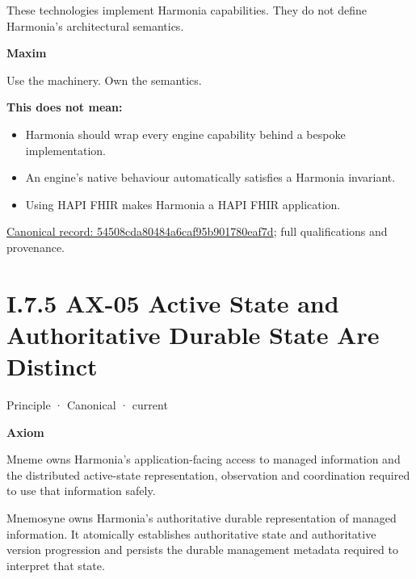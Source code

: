 These technologies implement Harmonia capabilities. They do not define
Harmonia's architectural semantics.



\par\medskip\textbf{Maxim}\par


Use the machinery. Own the semantics.



\textbf{This does not mean:}



\begin{itemize}


\item Harmonia should wrap every engine capability behind a bespoke implementation.

\item An engine's native behaviour automatically satisfies a Harmonia invariant.

\item Using HAPI FHIR makes Harmonia a HAPI FHIR application.

\end{itemize}

{\footnotesize \href{../../../../../../../../continuum/motivation/principle/54508cda80484a6caf95b901780eaf7d.md}{Canonical record: 54508cda80484a6caf95b901780eaf7d}; full qualifications and provenance.}\par
\section*{I.7.5 AX-05 Active State and Authoritative Durable State Are Distinct}
\label{navigation:I.7.5}

\label{element:0412a2084f0145babc4f022c71fea65f}
{\small Principle · Canonical · current}\par

\par\medskip\textbf{Axiom}\par


Mneme owns Harmonia's application-facing access to managed information
and the distributed active-state representation, observation and
coordination required to use that information safely.



Mnemosyne owns Harmonia's authoritative durable representation of
managed information. It atomically establishes authoritative state and
authoritative version progression and persists the durable management
metadata required to interpret that state.



